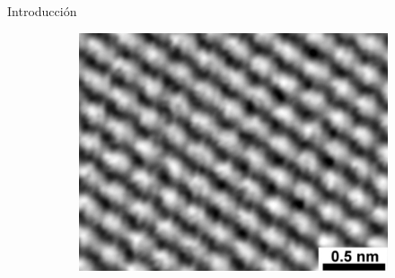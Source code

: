 \documentclass{beamer}
\begin{document}
\begin{frame}{Introducción}
\begin{figure}
\begin{subfigure}[b]{0.2\textwidth}
				\caption{}
				\label{fig:graphite_image}
			\end{subfigure}
			\begin{subfigure}[b]{0.2\textwidth}
				\caption{}
				\label{fig:graphene_struct}
			\end{subfigure}
			\begin{subfigure}[b]{0.2\textwidth}
				\includegraphics[width=\textwidth]{graphene_image.jpg}
				\caption{}
				\label{fig:graphene_image}
			\end{subfigure}

\end{figure}
\end{frame}
\end{document}
